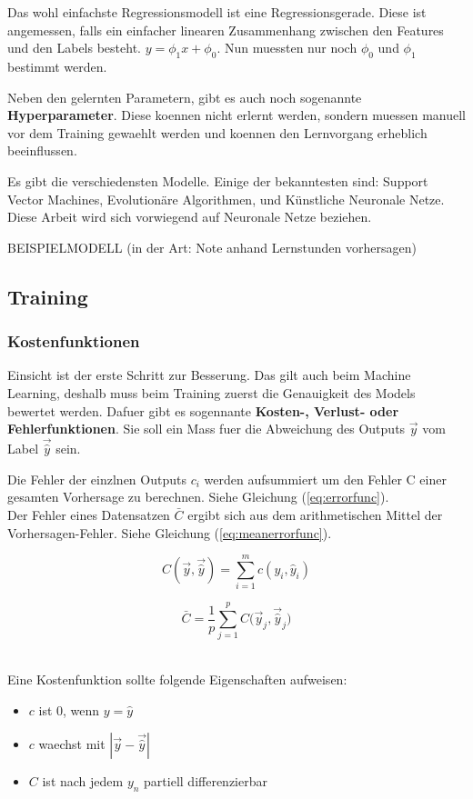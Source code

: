 \documentclass[../main]{subfiles}
\begin{document}
Das wohl einfachste Regressionsmodell ist eine Regressionsgerade. Diese ist angemessen, falls ein einfacher linearen Zusammenhang zwischen den Features und den Labels besteht.
$y=\phi_1x + \phi_0$. Nun muessten nur noch $\phi_0$ und $\phi_1$ bestimmt werden. 

Neben den gelernten Parametern, gibt es auch noch sogenannte \textbf{Hyperparameter}.
Diese koennen nicht erlernt werden, sondern muessen manuell vor dem Training gewaehlt werden und koennen den Lernvorgang erheblich beeinflussen.
\par
\medskip
Es gibt die verschiedensten Modelle. Einige der bekanntesten sind: Support Vector Machines, Evolutionäre Algorithmen, und Künstliche Neuronale Netze.
Diese Arbeit wird sich vorwiegend auf Neuronale Netze beziehen.

BEISPIELMODELL (in der Art: Note anhand Lernstunden vorhersagen)

\subsection{Training}
\subsubsection{Kostenfunktionen}
Einsicht ist der erste Schritt zur Besserung. Das gilt auch beim Machine Learning, deshalb muss beim Training zuerst die Genauigkeit des Models bewertet werden.
Dafuer gibt es sogennante \textbf{Kosten-, Verlust- oder Fehlerfunktionen}. Sie soll ein Mass fuer die Abweichung des Outputs $\vec{y}$ vom Label $\vec{\hat{y}}$ sein.
\par\medskip
Die Fehler der einzlnen Outputs $c_i$ werden aufsummiert um den Fehler C einer gesamten Vorhersage zu berechnen. Siehe Gleichung (\ref{eq:errorfunc}).\\
Der Fehler eines Datensatzen $\bar{C}$ ergibt sich aus dem arithmetischen Mittel der Vorhersagen-Fehler. Siehe Gleichung (\ref{eq:meanerrorfunc}).
\\
\begin{minipage}[h!]{0.5\textwidth}
    \centering
    \begin{equation}\label{eq:errorfunc}
        C(\vec{y},\vec{\hat{y}})=\displaystyle\sum_{i=1}^{m} c(y_i, \hat{y}_i)
    \end{equation}
\end{minipage}
\begin{minipage}[h!]{0.5\textwidth}
    \centering
    \begin{equation}\label{eq:meanerrorfunc}
        \bar{C} = \frac{1}{p}\displaystyle\sum_{j=1}^{p} C\Big(\vec{y}_j,\vec{\hat{y}}_j\Big)
    \end{equation}
\end{minipage}
\\
Eine Kostenfunktion sollte folgende Eigenschaften aufweisen:
\begin{itemize}
    \item{$c$ ist $0$, wenn $y = \hat{y}$}
    \item{$c$ waechst mit $|\vec{y}-\vec{\hat{y}}|$}
    \item{$C$ ist nach jedem $y_n$ partiell differenzierbar}
\end{itemize}
\end{document}
